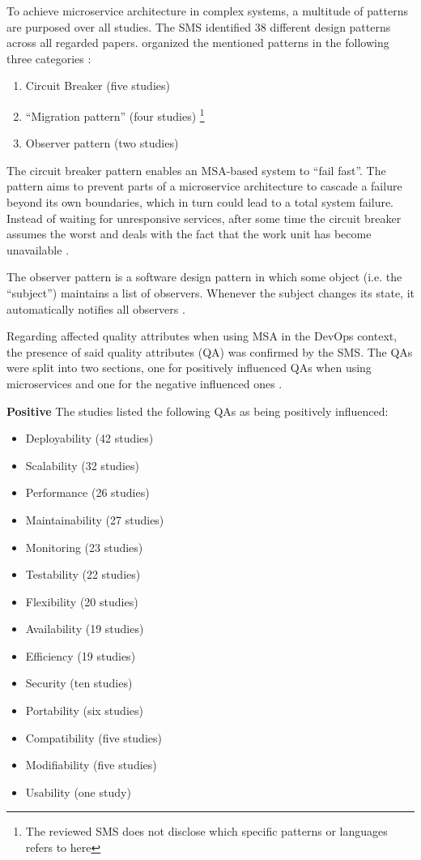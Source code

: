 To achieve microservice architecture in complex systems, a multitude of
patterns are purposed over all studies. The SMS identified 38 different design
patterns across all regarded papers. \smsAuthors organized the mentioned
patterns in the following three categories \cite{waseem:SMSMSADevOps}:

\begin{enumerate}
    \item Circuit Breaker (five studies)
    \item ``Migration pattern'' (four studies) \cite{waseem:SMSMSADevOps}
          \footnote{The reviewed SMS does not disclose which specific patterns or languages
              refers to here}
    \item Observer pattern (two studies)
\end{enumerate}

The circuit breaker pattern enables an MSA-based system to ``fail fast''.
The pattern aims to prevent parts of a microservice architecture to cascade
a failure beyond its own boundaries, which in turn could lead to a total
system failure. Instead of waiting for unresponsive services, after some time
the circuit breaker assumes the worst and deals with the fact that the
work unit has become unavailable \cite{montesi:CircuitBreakers}.

The observer pattern is a software design pattern in which some object (i.e. the ``subject'')
maintains a list of observers. Whenever the subject changes its state, it automatically
notifies all observers \cite{gof:DesignPatterns}.

Regarding affected quality attributes when using MSA in the DevOps context,
the presence of said quality attributes (QA) was confirmed by the SMS.
The QAs were split into two sections, one for positively influenced QAs when
using microservices and one for the negative influenced ones \cite{waseem:SMSMSADevOps}.

\textbf{Positive}
The studies listed the following QAs as being positively influenced:
\begin{itemize}
    \item Deployability (42 studies)
    \item Scalability (32 studies)
    \item Performance (26 studies)
    \item Maintainability (27 studies)
    \item Monitoring (23 studies)
    \item Testability (22 studies)
    \item Flexibility (20 studies)
    \item Availability (19 studies)
    \item Efficiency (19 studies)
    \item Security (ten studies)
    \item Portability (six studies)
    \item Compatibility (five studies)
    \item Modifiability (five studies)
    \item Usability (one study)
\end{itemize}

